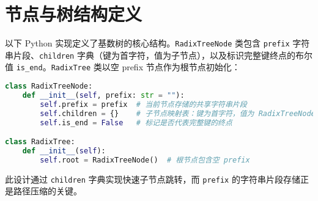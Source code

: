 \section{节点与树结构定义}
以下 Python 实现定义了基数树的核心结构。\texttt{RadixTreeNode} 类包含 \texttt{prefix} 字符串片段、\texttt{children} 字典（键为首字符，值为子节点），以及标识完整键终点的布尔值 \texttt{is\_{}end}。\texttt{RadixTree} 类以空 prefix 节点作为根节点初始化：\par
\begin{lstlisting}[language=python]
class RadixTreeNode:
    def __init__(self, prefix: str = ""):
        self.prefix = prefix  # 当前节点存储的共享字符串片段
        self.children = {}    # 子节点映射表：键为首字符，值为 RadixTreeNode
        self.is_end = False   # 标记是否代表完整键的终点

class RadixTree:
    def __init__(self):
        self.root = RadixTreeNode()  # 根节点包含空 prefix
\end{lstlisting}
此设计通过 \texttt{children} 字典实现快速子节点跳转，而 \texttt{prefix} 的字符串片段存储正是路径压缩的关键。\par

